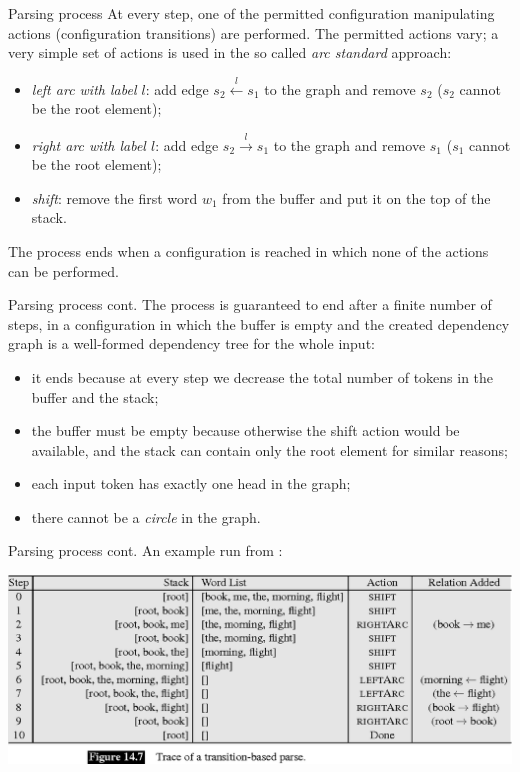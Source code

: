 \documentclass[style=upen, size=14pt]{powerdot}
\newcommand{\gold}{\color{arany}}
\theoremstyle{definition}
\begin{document}
\begin{slide}[toc=Parsing process]{Parsing process}
  At every step, one of the permitted configuration manipulating actions
  (configuration transitions) are performed. The permitted actions vary; a very
  simple set of actions is used in the so called \emph{\gold arc standard}
  approach:
  \begin{itemize}
  \item \emph{\gold left arc with label $l$}: add edge $s_2\xleftarrow{l} s_1$
    to the graph and remove $s_2$ ($s_2$ cannot be the root element);
  \item \emph{\gold right arc with label $l$}: add edge $s_2\xrightarrow{l} s_1$
    to the graph and remove $s_1$ ($s_1$ cannot be the root element);
  \item \emph{\gold shift}: remove the first word $w_1$ from the buffer and put
    it on the top of the stack.
  \end{itemize}
  The process ends when a configuration is reached in which none of the actions
  can be performed.
\end{slide}

\begin{slide}[toc=]{Parsing process cont.}
  The process is guaranteed to end after a finite number of steps, in a
  configuration in which the buffer is empty and the created dependency graph is
  a well-formed dependency tree for the whole input:
  \begin{itemize}
  \item it ends because at every step we decrease the total number of tokens in
    the buffer and the stack;
  \item the buffer must be empty because otherwise the shift action would be
    available, and the stack can contain only the root element for similar
    reasons;
  \item each input token has exactly one head in the graph;
  \item there cannot be a \emph{circle} in the graph.
  \end{itemize}
\end{slide}

\begin{slide}[toc=]{Parsing process cont.}
  An example run from \citet[ch. 16]{jurafsky2019speech}:
  \begin{center}
        \includegraphics[width=1.\textwidth]{figures/transition_run.eps}\\
  \end{center}
\end{slide}
\end{document}
